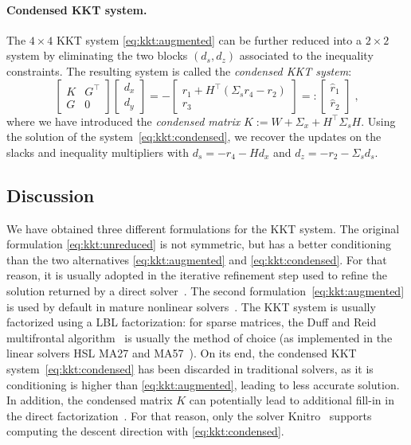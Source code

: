 \paragraph{Condensed KKT system.}
The $4 \times 4$ KKT system \eqref{eq:kkt:augmented} can be further
reduced into a $2 \times 2$ system by eliminating the two blocks
$(d_s, d_z)$ associated to the inequality constraints.
The resulting system is called the \emph{condensed KKT system}:
\begin{equation}
  \label{eq:kkt:condensed}
  \tag{$K_1$}
  \begin{bmatrix}
    K & G^\top \\
    G & 0
  \end{bmatrix}
  \begin{bmatrix}
    d_x \\ d_y
  \end{bmatrix}
  =
  -
  \begin{bmatrix}
    r_1 + H^\top(\Sigma_s r_4 - r_2) \\ r_3
  \end{bmatrix}
  =:
  \begin{bmatrix}
    \hat{r}_1 \\ \hat{r}_2
  \end{bmatrix}
   \; ,
\end{equation}
where we have introduced the \emph{condensed matrix} $K := W + \Sigma_x + H^\top \Sigma_s H$.
Using the solution of the system~\eqref{eq:kkt:condensed},
we recover the updates on the slacks and inequality multipliers with
$d_s = -r_4 - Hd_x$ and $d_z = -r_2 - \Sigma_s d_s$.

\subsection{Discussion}
We have obtained three different formulations for the KKT system.
The original formulation \eqref{eq:kkt:unreduced} is not symmetric, but
has a better conditioning than the two alternatives \eqref{eq:kkt:augmented}
and \eqref{eq:kkt:condensed}. For that reason, it is usually adopted
in the iterative refinement step used to refine the solution returned by
a direct solver~\cite{wachter2006implementation}. The second formulation~\eqref{eq:kkt:augmented} is
used by default in mature nonlinear solvers~\cite{wachter2006implementation,waltz2006interior}. The KKT system
is usually factorized using a LBL factorization: for sparse matrices, the Duff and Reid
multifrontal algorithm~\cite{duff1983multifrontal} is usually the method of choice (as implemented in the linear solvers HSL
MA27 and MA57~\cite{duff2004ma57}). On its end, the condensed KKT system~\eqref{eq:kkt:condensed}
has been discarded in traditional solvers, as it is conditioning is higher
than \eqref{eq:kkt:augmented}, leading to less accurate solution. In addition,
the condensed matrix $K$ can potentially lead to additional fill-in
in the direct factorization~\cite[Section 19.3, p.571]{nocedal_numerical_2006}.
For that reason, only the solver Knitro~\cite{waltz2006interior} supports computing the descent direction
with \eqref{eq:kkt:condensed}.

